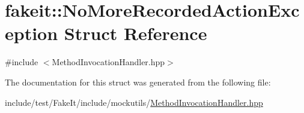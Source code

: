 \hypertarget{structfakeit_1_1NoMoreRecordedActionException}{}\section{fakeit\+::No\+More\+Recorded\+Action\+Exception Struct Reference}
\label{structfakeit_1_1NoMoreRecordedActionException}


{\ttfamily \#include $<$Method\+Invocation\+Handler.\+hpp$>$}



The documentation for this struct was generated from the following file\+:\begin{DoxyCompactItemize}
\item 
include/test/\+Fake\+It/include/mockutils/\mbox{\hyperlink{MethodInvocationHandler_8hpp}{Method\+Invocation\+Handler.\+hpp}}\end{DoxyCompactItemize}
